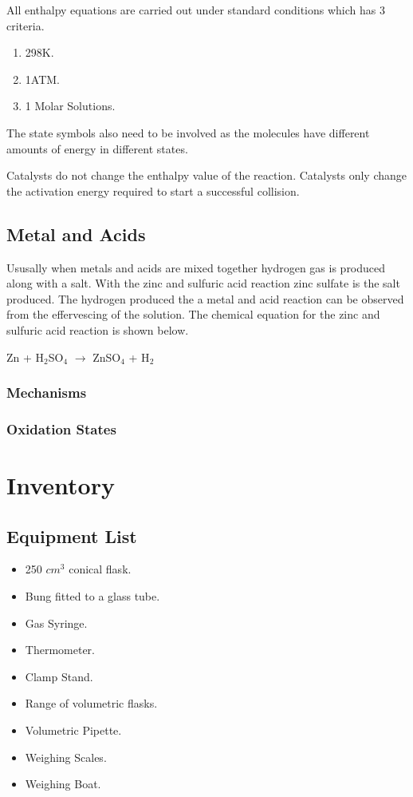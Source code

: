 All enthalpy equations are carried out under standard conditions which has 3 criteria.

\begin{enumerate}
\item 298K.
\item 1ATM.
\item 1 Molar Solutions.
\end{enumerate}

The state symbols also need to be involved as the molecules have different amounts of energy in different states. 

Catalysts do not change the enthalpy value of the reaction. Catalysts only change the activation energy required to start a successful collision.




	
	


	\subsection{Metal and Acids}

Ususally when metals and acids are mixed together hydrogen gas is produced along with a salt. With the zinc and sulfuric acid reaction zinc sulfate is the salt produced. The hydrogen produced the a metal and acid reaction can be observed from the effervescing of the solution. The chemical equation for the zinc and sulfuric acid reaction is shown below.

Zn + H$_2$SO$_4$ $\rightarrow$ ZnSO$_4$ + H$_2$

	\subsubsection{Mechanisms}

	\subsubsection{Oxidation States}




\section{Inventory}

	\subsection{Equipment List}
\begin{itemize}
\item 250 $cm^3$ conical flask.
\item Bung fitted to a glass tube.
\item Gas Syringe.
\item Thermometer.
\item Clamp Stand.
\item Range of volumetric flasks.
\item Volumetric Pipette.
\item Weighing Scales.
\item Weighing Boat.
\end{itemize}

